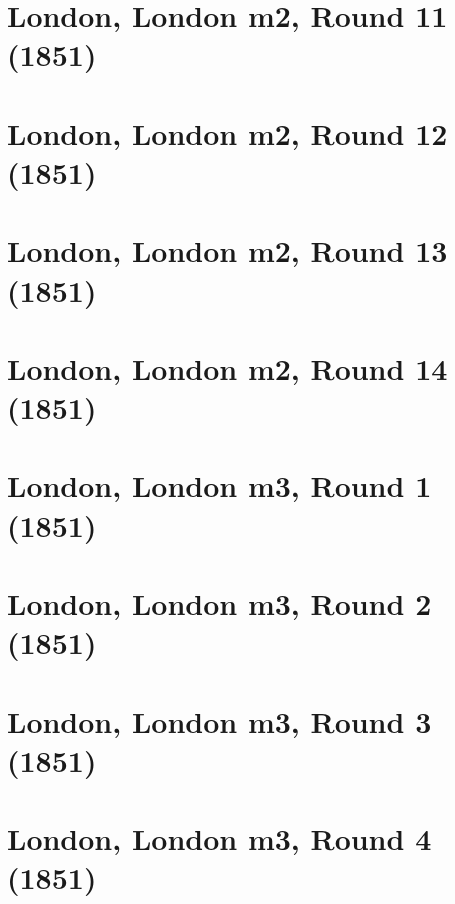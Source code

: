 \documentclass[11pt]{article}
\newcommand*\cleartoleftpage{%
   \clearpage
   \ifodd\value{page}\hbox{}\newpage\fi
}
\begin{document}
\cleartoleftpage

\section{London, London m2, Round 11 (1851)}


\cleartoleftpage

\section{London, London m2, Round 12 (1851)}


\cleartoleftpage

\section{London, London m2, Round 13 (1851)}


\cleartoleftpage

\section{London, London m2, Round 14 (1851)}


\cleartoleftpage

\section{London, London m3, Round 1 (1851)}


\cleartoleftpage

\section{London, London m3, Round 2 (1851)}


\cleartoleftpage

\section{London, London m3, Round 3 (1851)}


\cleartoleftpage

\section{London, London m3, Round 4 (1851)}

\end{document}
